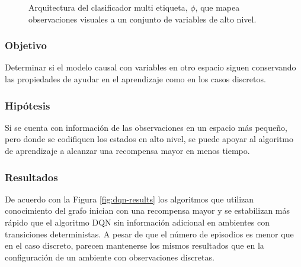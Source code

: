 \begin{itemize}
\begin{figure}
    \caption{Arquitectura del clasificador multi etiqueta, $\phi$, que
    mapea observaciones visuales a un conjunto de variables
    de alto nivel.}
    \label{fig:cnn-classifier}
\end{figure}
\end{itemize}
\subsubsection{Objetivo}

Determinar si el modelo causal con variables  en otro espacio siguen conservando las propiedades
de ayudar en el aprendizaje como en los casos discretos.

\subsubsection{Hipótesis}

Si se cuenta con información de las observaciones
en un espacio más pequeño, pero donde se codifiquen
los estados en alto nivel, se puede apoyar 
al algoritmo de aprendizaje a alcanzar una recompensa
mayor en menos tiempo.

\subsubsection{Resultados}

De acuerdo con la Figura \ref{fig:dqn-results} los algoritmos que utilizan conocimiento del grafo inician con una recompensa mayor y se estabilizan más rápido que el algoritmo DQN
sin información adicional en ambientes con transiciones deterministas. A pesar de que 
el número de episodios
es menor que en el caso 
discreto, parecen mantenerse los mismos resultados 
que en la configuración de un ambiente con observaciones
discretas.

